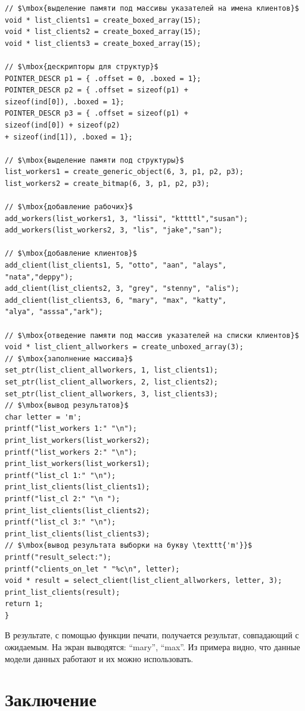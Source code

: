 \begin{lstlisting}[mathescape]
// $\mbox{выделение памяти под массивы указателей на имена клиентов}$
void * list_clients1 = create_boxed_array(15);  
void * list_clients2 = create_boxed_array(15);
void * list_clients3 = create_boxed_array(15);

// $\mbox{дескрипторы для структур}$
POINTER_DESCR p1 = { .offset = 0, .boxed = 1};
POINTER_DESCR p2 = { .offset = sizeof(p1) + 
sizeof(ind[0]), .boxed = 1};
POINTER_DESCR p3 = { .offset = sizeof(p1) + 
sizeof(ind[0]) + sizeof(p2)
+ sizeof(ind[1]), .boxed = 1};

// $\mbox{выделение памяти под структуры}$
list_workers1 = create_generic_object(6, 3, p1, p2, p3);
list_workers2 = create_bitmap(6, 3, p1, p2, p3);

// $\mbox{добавление рабочих}$
add_workers(list_workers1, 3, "lissi", "kttttl","susan");
add_workers(list_workers2, 3, "lis", "jake","san");

// $\mbox{добавление клиентов}$
add_client(list_clients1, 5, "otto", "aan", "alays",
"nata","deppy");
add_client(list_clients2, 3, "grey", "stenny", "alis");
add_client(list_clients3, 6, "mary", "max", "katty",
"alya", "asssa","ark");

// $\mbox{отведение памяти под массив указателей на списки клиентов}$
void * list_client_allworkers = create_unboxed_array(3);
// $\mbox{заполнение массива}$
set_ptr(list_client_allworkers, 1, list_clients1);
set_ptr(list_client_allworkers, 2, list_clients2);
set_ptr(list_client_allworkers, 3, list_clients3);
// $\mbox{вывод результатов}$
char letter = 'm';
printf("list_workers 1:" "\n");
print_list_workers(list_workers2);
printf("list_workers 2:" "\n");
print_list_workers(list_workers1);
printf("list_cl 1:" "\n");
print_list_clients(list_clients1);
printf("list_cl 2:" "\n ");
print_list_clients(list_clients2);
printf("list_cl 3:" "\n");
print_list_clients(list_clients3);
// $\mbox{вывод результата выборки на букву \texttt{'m'}}$
printf("result_select:");
printf("clients_on_let " "%c\n", letter);
void * result = select_client(list_client_allworkers, letter, 3);
print_list_clients(result);
return 1;
}
\end{lstlisting}

В результате, с помощью функции печати, получается результат, совпадающий с ожидаемым. На экран выводятся: ``mary'', ``max''.
Из примера видно, что данные модели данных работают и их можно использовать.

\section*{Заключение}

